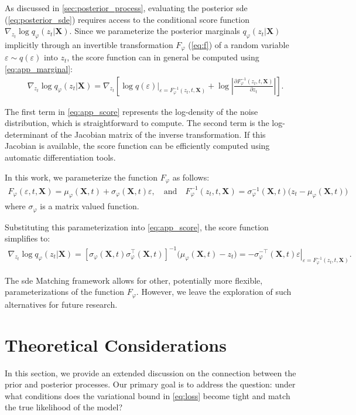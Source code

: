 \documentclass{article}
\def\X{\mathbf{X}}
\def\s{\sigma}
\def\e{\varepsilon}
\def\ph{\varphi}
\def\p{\partial}
\def\n{\nabla}
\theoremstyle{plain}
\theoremstyle{definition}
\theoremstyle{remark}
\begin{document}
As discussed in \cref{sec:posterior_process}, evaluating the posterior \gls{sde} (\cref{eq:posterior_sde}) requires access to the conditional score function $\n_{z_t} \log q_\ph(z_t|\X)$. Since we parameterize the posterior marginals $q_\ph(z_t|\X)$ implicitly through an invertible transformation $F_\ph$ (\cref{eq:f}) of a random variable $\e \sim q(\e)$ into $z_t$, the score function can in general be computed using \cref{eq:app_marginal}:
\begin{align}
    & \n_{z_t} \log q_\ph(z_t|\X) = \n_{z_t} \left[ \log q(\e) \Big|_{\e = F_\ph^{-1}(z_t, t, \X)} + \log \left| \frac{\p F^{-1}_\ph(z_t, t, \X)}{\p z_t} \right| \right].
    \label{eq:app_score}
\end{align}


The first term in \cref{eq:app_score} represents the log-density of the noise distribution, which is straightforward to compute. The second term is the log-determinant of the Jacobian matrix of the inverse transformation. If this Jacobian is available, the score function can be efficiently computed using automatic differentiation tools.


In this work, we parameterize the function $F_\ph$ as follows:
\begin{align}
    F_\ph(\e, t, \X) = \mu_\ph(\X, t) + \s_\ph(\X, t) \e, \quad \textrm{and} \quad F_\ph^{-1}(z_t, t, \X) = \s_\ph^{-1}(\X, t) \big( z_t - \mu_\ph(\X, t) \big)
    \label{eq:app_f}
\end{align}
where $\s_\ph$ is a matrix valued function.


Substituting this parameterization into \cref{eq:app_score}, the score function simplifies to:
\begin{align}
    \n_{z_t} \log q_\ph(z_t|\X) = \left[ \s_\ph(\X, t) \s_\ph^\top(\X, t) \right]^{-1} \big( \mu_\ph(\X, t) - z_t \big) = \left. - \s_\ph^{-\top}(\X, t) \e \right|_{\e=F_\ph^{-1}(z_t, t, \X)}.
\end{align}


The \gls{sde} Matching framework allows for other, potentially more flexible, parameterizations of the function $F_\ph$. However, we leave the exploration of such alternatives for future research.


\section{Theoretical Considerations}
\label{app:theory}


In this section, we provide an extended discussion on the connection between the prior and posterior processes. Our primary goal is to address the question: under what conditions does the variational bound in \cref{eq:loss} become tight and match the true likelihood of the model?
\end{document}
